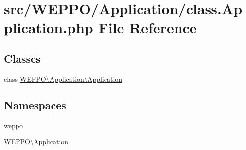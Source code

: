\hypertarget{class_8Application_8php}{}\section{src/\+W\+E\+P\+P\+O/\+Application/class.Application.\+php File Reference}
\label{class_8Application_8php}
\subsection*{Classes}
\begin{DoxyCompactItemize}
\item 
class \hyperlink{classWEPPO_1_1Application_1_1Application}{W\+E\+P\+P\+O\textbackslash{}\+Application\textbackslash{}\+Application}
\end{DoxyCompactItemize}
\subsection*{Namespaces}
\begin{DoxyCompactItemize}
\item 
 \hyperlink{namespaceweppo}{weppo}
\item 
 \hyperlink{namespaceWEPPO_1_1Application}{W\+E\+P\+P\+O\textbackslash{}\+Application}
\end{DoxyCompactItemize}
